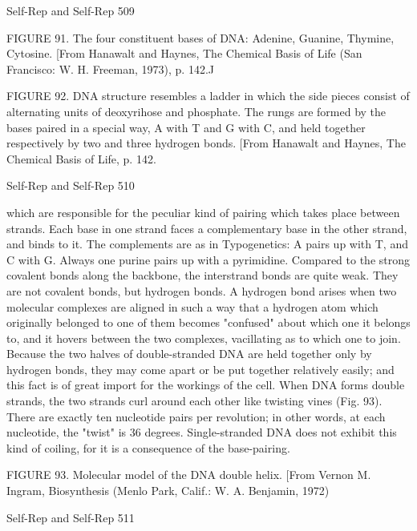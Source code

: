 {Self-Rep and Self-Rep                                                                       509

FIGURE 91. The four constituent bases of DNA: Adenine, Guanine, Thymine, Cytosine.
[From Hanawalt and Haynes, The Chemical Basis of Life (San Francisco: W. H. Freeman,
1973), p. 142.J


FIGURE 92. DNA structure resembles a ladder in which the side pieces consist of alternating
units of deoxyrihose and phosphate. The rungs are formed by the bases paired in a special
way, A with T and G with C, and held together respectively by two and three hydrogen
bonds. [From Hanawalt and Haynes, The Chemical Basis of Life, p. 142.




Self-Rep and Self-Rep                                                                  510

which are responsible for the peculiar kind of pairing which takes place between strands.
Each base in one strand faces a complementary base in the other strand, and binds to it. The
complements are as in Typogenetics: A pairs up with T, and C with G. Always one purine
pairs up with a pyrimidine.
         Compared to the strong covalent bonds along the backbone, the interstrand bonds are
quite weak. They are not covalent bonds, but hydrogen bonds. A hydrogen bond arises when
two molecular complexes are aligned in such a way that a hydrogen atom which originally
belonged to one of them becomes "confused" about which one it belongs to, and it hovers
between the two complexes, vacillating as to which one to join. Because the two halves of
double-stranded DNA are held together only by hydrogen bonds, they may come apart or be
put together relatively easily; and this fact is of great import for the workings of the cell.
         When DNA forms double strands, the two strands curl around each other like
twisting vines (Fig. 93). There are exactly ten nucleotide pairs per revolution; in other words,
at each nucleotide, the "twist" is 36 degrees. Single-stranded DNA does not exhibit this kind
of coiling, for it is a consequence of the base-pairing.




FIGURE 93. Molecular model of the DNA double helix. [From Vernon M. Ingram,
Biosynthesis (Menlo Park, Calif.: W. A. Benjamin, 1972)




Self-Rep and Self-Rep                                                                       511

}

